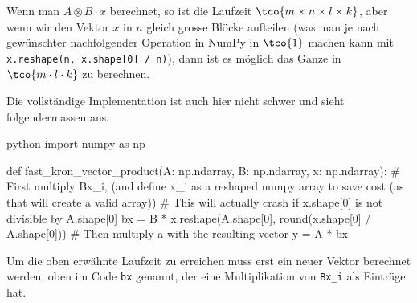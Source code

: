  Wenn man $A \otimes B \cdot x$ berechnet, so ist die Laufzeit $\tco{m \times n \times l \times k}$, aber wenn wir den Vektor $x$ in $n$ gleich grosse Blöcke aufteilen (was man je nach gewünschter nachfolgender Operation in NumPy in $\tco{1}$ machen kann mit \verb|x.reshape(n, x.shape[0] / n)|), dann ist es möglich das Ganze in $\tco{m \cdot l \cdot k}$ zu berechnen. 

Die vollständige Implementation ist auch hier nicht schwer und sieht folgendermassen aus:
\begin{code}{python}
import numpy as np

def fast_kron_vector_product(A: np.ndarray, B: np.ndarray, x: np.ndarray):
    # First multiply Bx_i, (and define x_i as a reshaped numpy array to save cost (as that will create a valid array))
    # This will actually crash if x.shape[0] is not divisible by A.shape[0]
    bx = B * x.reshape(A.shape[0], round(x.shape[0] / A.shape[0]))
    # Then multiply a with the resulting vector
    y = A * bx
\end{code}

Um die oben erwähnte Laufzeit zu erreichen muss erst ein neuer Vektor berechnet werden, oben im Code \verb|bx| genannt, der eine Multiplikation von \verb|Bx_i| als Einträge hat.
